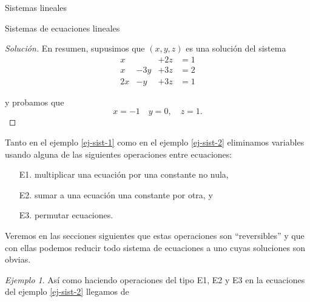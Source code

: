 \documentclass[a4paper,12pt,twoside,spanish,reqno]{amsbook}
\numberwithin{equation}{section}
\theoremstyle{definition}
\theoremstyle{remark}
\newtheorem*{ejemplo*}{Ejemplo}
\begin{document}
\begin{chapter}{Sistemas lineales}
\begin{section}{Sistemas de ecuaciones lineales}
\begin{proof}[Solución]
 

 
En resumen, supusimos que $(x,y,z)$ es una solución del sistema
\begin{equation*}
\begin{matrix}
x &  & +2z & = 1 \\
x& -3y & +3z & =2 \\
2x& -y & +3z & =1
\end{matrix}
\end{equation*}

y probamos que 
\begin{equation*}
x=-1\quad y=0,\quad z=1. 
\end{equation*}
                \end{proof}




Tanto en el ejemplo \ref{ej-sist-1} como en el ejemplo \ref{ej-sist-2} eliminamos variables usando alguna de las siguientes operaciones entre ecuaciones:
    \begin{enumerate}
        \item[E1.] multiplicar una ecuación por una constante no nula,  
        \item[E2.] sumar a una ecuación una constante por otra, y
        \item[E3.] permutar ecuaciones.  
    \end{enumerate}
    Veremos en  las secciones siguientes que estas operaciones son ``reversibles'' y que con ellas podemos reducir todo sistema de ecuaciones a uno cuyas soluciones son obvias. 
    
    
\begin{ejemplo*}
Así como  haciendo operaciones del tipo E1, E2 y E3  en la ecuaciones del ejemplo \ref{ej-sist-2}   llegamos de 
    

\end{ejemplo*}
\end{section}
\end{chapter}
\end{document}
